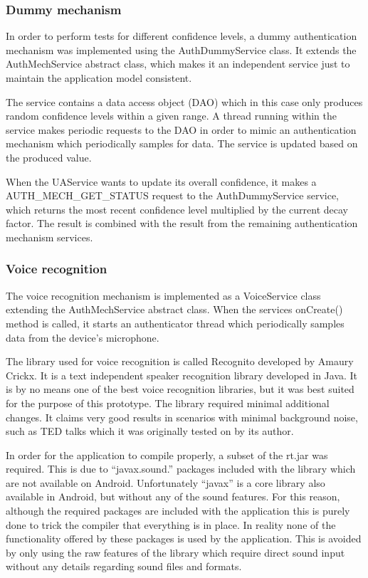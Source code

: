 \subsubsection{Dummy mechanism}
In order to perform tests for different confidence levels, a dummy authentication mechanism was implemented using the AuthDummyService class. It extends the AuthMechService abstract class, which makes it an independent service just to maintain the application model consistent. 

The service contains a data access object (DAO) which in this case only produces random confidence levels within a given range. A thread running within the service makes periodic requests to the DAO in order to mimic an authentication mechanism which periodically samples for data. The service is updated based on the produced value. 

When the UAService wants to update its overall confidence, it makes a AUTH\_MECH\_GET\_STATUS request to the AuthDummyService service, which returns the most recent confidence level multiplied by the current decay factor. The result is combined with the result from the remaining authentication mechanism services.

\subsubsection{Voice recognition}
The voice recognition mechanism is implemented as a VoiceService class extending the AuthMechService abstract class. When the services onCreate() method is called, it starts an authenticator thread which periodically samples data from the device's microphone.

The library used for voice recognition is called Recognito developed by Amaury Crickx. It is a text independent speaker recognition library developed in Java. It is by no means one of the best voice recognition libraries, but it was best suited for the purpose of this prototype. The library required minimal additional changes. It claims very good results in scenarios with minimal background noise, such as TED talks \cite{} which it was originally tested on by its author.

In order for the application to compile properly, a subset of the rt.jar was required. This is due to ``javax.sound.'' packages included with the library which are not available on Android. Unfortunately ``javax'' is a core library also available in Android, but without any of the sound features. For this reason, although the required packages are included with the application this is purely done to trick the compiler that everything is in place. In reality none of the functionality offered by these packages is used by the application. This is avoided by only using the raw features of the library which require direct sound input without any details regarding sound files and formats.

